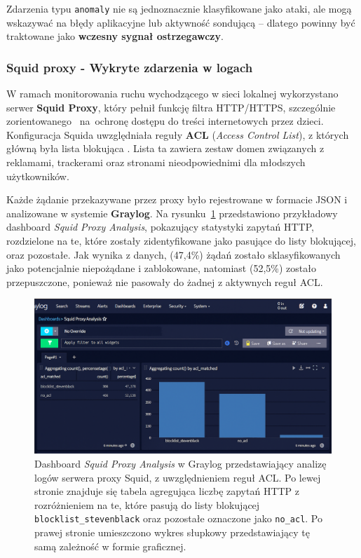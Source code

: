 \documentclass[
    left=2.5cm,         %
    right=2.5cm,        %
    top=2.5cm,          %
    bottom=3cm,         %
    bindingoffset=6mm,  %
    nohyphenation=true %
]{eiti/eiti-thesis} %
\begin{document}
Zdarzenia typu \texttt{anomaly} nie są jednoznacznie klasyfikowane jako ataki, ale mogą wskazywać na błędy aplikacyjne lub aktywność sondującą – dlatego powinny być traktowane jako \textbf{wczesny sygnał ostrzegawczy}.

\subsubsection{Squid proxy - Wykryte zdarzenia w logach}

W ramach monitorowania ruchu wychodzącego w sieci lokalnej wykorzystano serwer \textbf{Squid Proxy}, który pełnił funkcję filtra HTTP/HTTPS, szczególnie zorientowanego ~na~ochronę dostępu do treści internetowych przez dzieci. Konfiguracja Squida uwzględniała reguły \textbf{ACL} (\textit{Access Control List}), z których główną była lista blokująca \cite{stevenblack-blocklist}. Lista ta zawiera zestaw domen związanych z reklamami, trackerami oraz stronami nieodpowiednimi dla młodszych użytkowników.

Każde żądanie przekazywane przez proxy było rejestrowane w formacie JSON i analizowane w systemie \textbf{Graylog}. Na rysunku~\ref{fig:graylog-squid-logs} przedstawiono przykładowy dashboard \textit{Squid Proxy Analysis}, pokazujący statystyki zapytań HTTP, rozdzielone na te, które zostały zidentyfikowane jako pasujące do listy blokującej, oraz pozostałe. Jak wynika z danych, (47{,}4\%) żądań zostało sklasyfikowanych jako potencjalnie niepożądane i zablokowane, natomiast (52{,}5\%) zostało przepuszczone, ponieważ nie pasowały do żadnej z aktywnych reguł ACL.

\newpage
\begin{figure}[H]
    \centering
    \includegraphics[width=\textwidth]{img/graylog_proxy.png}
    \caption{Dashboard \textit{Squid Proxy Analysis} w Graylog przedstawiający analizę logów serwera proxy Squid, z uwzględnieniem reguł ACL. Po lewej stronie znajduje się tabela agregująca liczbę zapytań HTTP z rozróżnieniem na te, które pasują do listy blokującej \texttt{blocklist\_stevenblack} oraz pozostałe oznaczone jako \texttt{no\_acl}. Po prawej stronie umieszczono wykres słupkowy przedstawiający tę samą zależność w formie graficznej.}
    \label{fig:graylog-squid-logs}
\end{figure}
\end{document}
